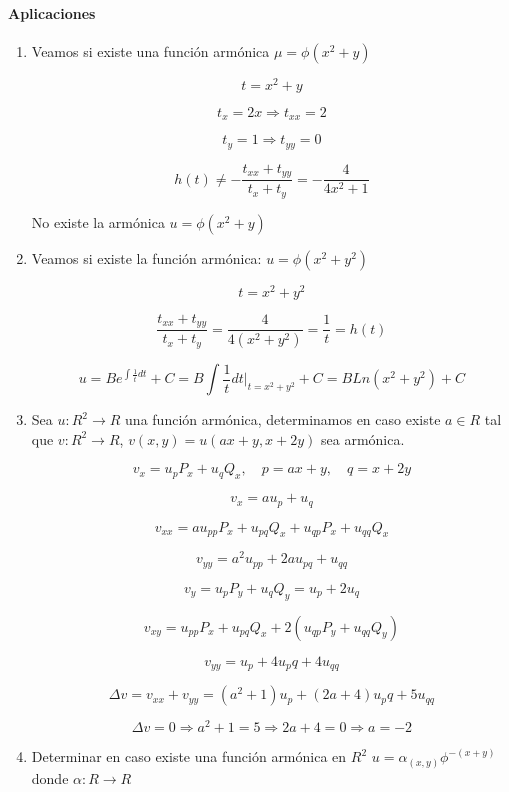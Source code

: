 \documentclass[a4paper,12pt]{article}
\begin{document}
\paragraph{Aplicaciones}
\begin{enumerate}
    \item Veamos si existe una función armónica \(\mu = \phi(x^2 + y)\)

\[ t = x^2 + y \]

\[ t_x = 2x \Rightarrow t_{xx} = 2 \]

\[ t_y = 1 \Rightarrow t_{yy} = 0 \]

\[ h(t) \neq -\frac{t_{xx} + t_{yy}}{t_x + t_y} = -\frac{4}{4x^2 + 1} \]

No existe la armónica \(u = \phi(x^2 + y)\)

\item  Veamos si existe la función armónica: \(u = \phi(x^2 + y^2)\)

\[ t = x^2 + y^2 \]

\[ \frac{t_{xx} + t_{yy}}{t_x + t_y} = \frac{4}{4(x^2 + y^2)} = \frac{1}{t} = h(t) \]

\[ u = Be^{\int \frac{1}{t} dt} + C = B \int \frac{1}{t} dt \bigg|_{t = x^2 + y^2} + C = BLn(x^2 + y^2) + C \]

\item  Sea \(u : R^2 \rightarrow R\) una función armónica, determinamos en caso existe \(a \in R\) tal que \(v : R^2 \rightarrow R\), \(v(x, y) = u(ax + y, x + 2y)\) sea armónica.

\[ v_x = u_p P_x + u_q Q_x, \quad p = ax + y, \quad q = x + 2y \]

\[ v_x = a u_p + u_q \]

\[ v_{xx} = a u_{pp} P_x + u_{pq} Q_x + u_{qp} P_x + u_{qq} Q_x \]

\[ v_{yy} = a^2 u_{pp} + 2a u_{pq} + u_{qq} \]

\[ v_y = u_p P_y + u_q Q_y = u_p + 2 u_q \]

\[ v_{xy} = u_{pp} P_x + u_{pq} Q_x + 2(u_{qp} P_y + u_{qq} Q_y) \]

\[ v_{yy} = u_p + 4 u_pq + 4 u_{qq} \]

\[ \Delta v = v_{xx} + v_{yy} = (a^2 + 1) u_p + (2a + 4) u_pq + 5 u_{qq} \]

\[ \Delta v = 0 \Rightarrow a^2 + 1 = 5 \Rightarrow 2a + 4 = 0 \Rightarrow a = -2 \]

\item  Determinar en caso existe una función armónica en \(R^2\) \(u = \alpha_{(x,y)} \phi^{-(x+y)}\) donde \(\alpha : R \rightarrow R\)




\end{enumerate}
\end{document}
